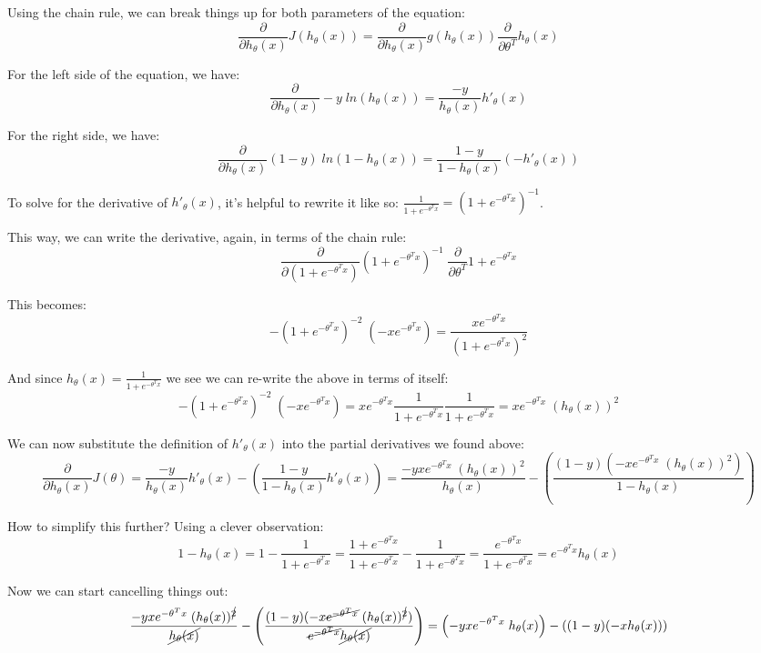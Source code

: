 \documentclass[11pt]{article}
\begin{document}
Using the chain rule, we can break things up for both parameters of the equation:
\[
\frac{\partial}{\partial h_\theta(x)} J(h_\theta(x)) = \frac{\partial}{\partial
h_\theta(x)} g(h_\theta(x)) \frac{\partial}{\partial \theta^T} h_\theta(x)
\]

For the left side of the equation, we have:
\[
\frac{\partial}{\partial h_\theta(x)} -y \; ln(h_\theta(x)) = \frac{-y}{h_\theta(x)}
h'_\theta(x)
\]

For the right side, we have:
\[
\frac{\partial}{\partial h_\theta(x)} (1-y) \; ln(1 - h_\theta(x))
 = \frac{1 - y}{1 - h_\theta(x)}( -h'_\theta(x))
\]

To solve for the derivative of \(h'_\theta(x)\), it's helpful to rewrite it like so:
\(\frac{1}{1+e^{-\theta^T x}} = (1+e^{-\theta^T x})^{-1}\).

This way, we can write the derivative, again, in terms of the chain rule:
\[
\frac{\partial}{\partial (1+e^{-\theta^T x})}(1+e^{-\theta^T x})^{-1} \;
\frac{\partial}{\partial \theta^T} 1+e^{-\theta^T x}
\]

This becomes:
\[
-(1+e^{-\theta^T x})^{-2} \; (-xe^{-\theta^T x}) = \frac{xe^{-\theta^T
x}}{(1+e^{-\theta^T x})^2}
\]

And since \(h_\theta(x) = \frac{1}{1 + e^{-\theta^T x}}\) we see we can re-write the
above in terms of itself:
\[
-(1+e^{-\theta^T x})^{-2} \; (-xe^{-\theta^T x}) = x e^{-\theta^T x}
\frac{1}{1+e^{-\theta^T x}} \frac{1}{1+e^{-\theta^T x}} = x e^{-\theta^T x} \; (h_\theta(x))^2
\]

We can now substitute the definition of \(h'_\theta(x)\) into the partial derivatives
we found above:
\[
\frac{\partial}{\partial h_\theta(x)} J(\theta) = \frac{-y}{h_\theta(x)}
h'_\theta(x) - \left( \frac{1 - y}{1 - h_\theta(x)} h'_\theta(x) \right) = \frac{-y x e^{-\theta^T x} \; (h_\theta(x))^2}{h_\theta(x)} - \left( \frac{(1 - y)(-x
e^{-\theta^T x} \; (h_\theta(x))^2)}{1 - h_\theta(x)} \right)
\]

How to simplify this further? Using a clever observation:
\[
1-h_\theta(x) = 1 - \frac{1}{1+e^{-\theta^T x}} = \frac{1+e^{-\theta^T
x}}{1+e^{-\theta^T x}} - \frac{1}{1+e^{-\theta^T x}} = \frac{e^{-\theta^T
x}}{1+e^{-\theta^T x}} = e^{-\theta^T x}h_\theta(x)
\]

Now we can start cancelling things out:
\[
\frac{-y x e^{-\theta^T x} \; (h_\theta(x))^{\cancel{2}}}{\cancel{h_\theta(x)}} - \left( \frac{(1 - y)(-x
\cancel{e^{-\theta^T x}} \; (h_\theta(x))^{\cancel{2}})}{\cancel{e^{-\theta^T x}}
\cancel{h_\theta(x)}} \right) = \left (-y x e^{-\theta^T x} \; h_\theta(x)\right) -\left( (1 - y)(-x h_\theta(x))\right)
\]
\end{document}

